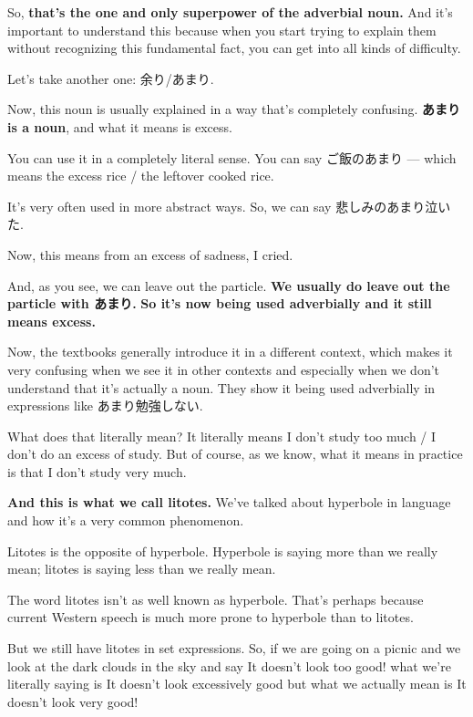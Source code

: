 {}

So, {\bf that's the one and only superpower of the adverbial noun.} And it's important to understand this because when you start trying to explain them without recognizing this fundamental fact, you can get into all kinds of difficulty.

Let's take another one: 余り/あまり.

\startsectionlevel[title={あまり},reference={あまり}]

Now, this noun is usually explained in a way that's completely confusing. {\bf あまり is a noun}, and what it means is excess.

You can use it in a completely literal sense. You can say ご飯のあまり --- which means the excess rice / the leftover cooked rice.

It's very often used in more abstract ways. So, we can say 悲しみのあまり泣いた.

Now, this means from an excess of sadness, I cried.

{}

And, as you see, we can leave out the particle. {\bf We usually do leave out the particle with あまり.} {\bf So it's now being used adverbially and it still means excess.}

Now, the textbooks generally introduce it in a different context, which makes it very confusing when we see it in other contexts and especially when we don't understand that it's actually a noun. They show it being used adverbially in expressions like あまり勉強しない.

{}

What does that literally mean? It literally means I don't study too much / I don't do an excess of study. But of course, as we know, what it means in practice is that I don't study very much.

{\bf And this is what we call litotes.} We've talked about hyperbole in language and how it's a very common phenomenon.

Litotes is the opposite of hyperbole. Hyperbole is saying more than we really mean; litotes is saying less than we really mean.

The word litotes isn't as well known as hyperbole. That's perhaps because current Western speech is much more prone to hyperbole than to litotes.

But we still have litotes in set expressions. So, if we are going on a picnic and we look at the dark clouds in the sky and say It doesn't look too good! what we're literally saying is It doesn't look excessively good but what we actually mean is It doesn't look very good!

